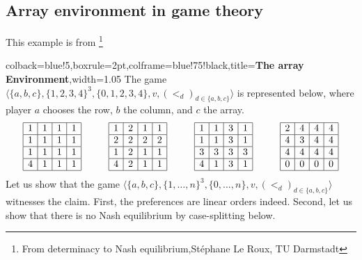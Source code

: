 \subsection{Array environment in game theory}
This example is from \footnote{From determinacy to Nash equilibrium,St\'ephane Le Roux, TU Darmstadt }
\begin{tcblisting}{colback=blue!5,boxrule=2pt,colframe=blue!75!black,title=\textbf{The array Environment},width=1.05\textwidth}
The game $\langle\{a,b,c\},\{1,2,3,4\}^3,\{0,1,2,3,4\},v,(<_d)_{d\in\{a,b,c\}}\rangle$ is represented below, where player $a$ chooses the row, $b$ the column, and $c$ the array. 
\[\begin{array}{c@{\hspace{1cm}}c@{\hspace{1cm}}c@{\hspace{1cm}}c}
\begin{array}{|c|c|c|c|}
\hline 1 & 1 & 1 & 1\\
\hline 1 & 1 & 1 & 1\\
\hline 1 & 1 & 1 & 1\\
\hline 4 & 1 & 1 & 1\\
\hline
\end{array}
&
\begin{array}{|c|c|c|c|}
\hline 1 & 2 & 1 & 1\\
\hline 2 & 2 & 2 & 2\\
\hline 1 & 2 & 1 & 1\\
\hline 4 & 2 & 1 & 1\\
\hline
\end{array}
&
\begin{array}{|c|c|c|c|}
\hline 1 & 1 & 3 & 1\\
\hline 1 & 1 & 3 & 1\\
\hline 3 & 3 & 3 & 3\\
\hline 4 & 1 & 3 & 1\\
\hline
\end{array}
&
\begin{array}{|c|c|c|c|}
\hline 2 & 4 & 4 & 4\\
\hline 4 & 3 & 4 & 4\\
\hline 4 & 4 & 4 & 4\\
\hline 0 & 0 & 0 & 0\\
\hline
\end{array}
\end{array}
\]
Let us show that the game $\langle\{a,b,c\},\{1,\dots,n\}^3,\{0,\dots,n\},v,(<_d)_{d\in\{a,b,c\}}\rangle$ witnesses the claim. First, the preferences are linear orders indeed. Second, let us show that there is no Nash equilibrium by case-splitting below. 
\end{tcblisting}

